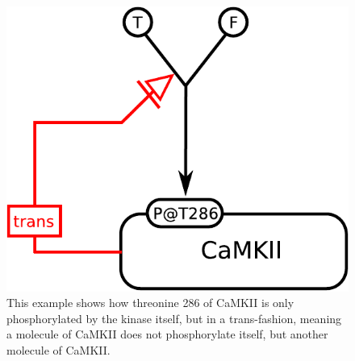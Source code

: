 \begin{figure}[H]
  \centering
  \includegraphics[scale = 0.5]{examples/ex-necessaryStimulation}
  \caption{This example shows how threonine 286 of CaMKII is only phosphorylated by the kinase itself, but in a trans-fashion, meaning a molecule of CaMKII does not phosphorylate itself, but another molecule of CaMKII.}
  \label{fig:ex-necessaryStimulation}
\end{figure}

